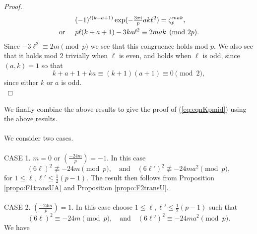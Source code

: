 \documentclass[12pt]{amsart}
\theoremstyle{definition}
\theoremstyle{remark}
\numberwithin{equation}{section}
\newcommand\leg[2]{\genfrac{(}{)}{}{}{#1}{#2}} %
\newcommand\propo[1]{\ref{propo:#1}}
\newcommand\eqn[1]{(\ref{eq:#1})}
\begin{document}
\begin{proof}
\begin{align*}
&(-1)^{\ell(k + a +1)}
 \exp( -\tfrac{3 \pi i}{p} a k \ell^2) = \zeta_p^{mak},
 \\
\text{or}\hspace{5mm}&p \ell(k + a + 1) - 3ka\ell^2 \equiv 2 m a k \pmod{2p}.
\end{align*}
\noindent
Since $-3\ell^2 \equiv 2m \pmod{p}$ we see that this congruence
holds mod $p$. We also see that it holds mod $2$ trivially when $\ell$ is
even, and holds when $\ell$ is odd, since $(a,k)=1$ so
that
$$
k + a + 1 + ka \equiv (k+1)(a + 1) \equiv 0 \pmod{2},
$$
since either $k$ or $a$ is odd.\\
\end{proof}

We finally combine the above results to give the proof of \eqn{eqnKpmid} using the above results.
\\\\
We consider two cases.
\\\\
CASE 1.  $m=0$ or $\leg{-24m}{p}=-1$.  In this case
$$
(6 \ell)^2 \not\equiv -24m \pmod{p},\quad\mbox{and}\quad
(6 \ell')^2 \not\equiv -24ma^2 \pmod{p},                                 
$$ 
for $1 \le \ell, \ell' \le \tfrac{1}{2}(p-1)$. The result then
follows from Proposition \propo{F1transUA} and Proposition \propo{F2transU}. 
\\\\
CASE 2.  $\leg{-24m}{p}=1$.  In this case choose 
$1 \le \ell, \ell' \le \tfrac{1}{2}(p-1)$ such that          
$$
(6 \ell)^2 \equiv -24m \pmod{p},\quad\mbox{and}\quad
(6 \ell')^2 \equiv -24ma^2 \pmod{p}.                                 
$$
We have
\end{document}
